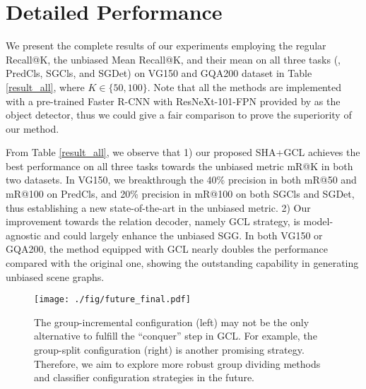 \documentclass[10pt,twocolumn,letterpaper]{article}
\begin{document}
\section{Detailed Performance}
We present the complete results of our experiments employing the regular Recall@K\cite{lu2016visual}, the unbiased Mean Recall@K\cite{tang2019learning,chen2019knowledge}, and their mean\cite{lin2020gps} on all three tasks (\ie, PredCls, SGCls, and SGDet) on VG150\cite{krishna2016visual} and GQA200\cite{hudson2019gqa} dataset in Table \ref{result_all}, where $K \in \{50,100\}$. Note that all the methods are implemented with a pre-trained Faster R-CNN\cite{Ren2017Faster} with ResNeXt-101-FPN\cite{xie2017aggregated} provided by \cite{tang2020unbiased} as the object detector, thus we could give a fair comparison to prove the superiority of our method.

From Table \ref{result_all}, we observe that 1) our proposed SHA+GCL achieves the best performance on all three tasks towards the unbiased metric mR@K in both two datasets. In VG150, we breakthrough the 40\% precision in both mR@50 and mR@100 on PredCls, and 20\% precision in mR@100 on both SGCls and SGDet, thus establishing a new state-of-the-art in the unbiased metric. 2) Our improvement towards the relation decoder, namely GCL strategy, is model-agnostic and could largely enhance the unbiased SGG. In both VG150 or GQA200, the method equipped with GCL nearly doubles the performance compared with the original one, showing the outstanding capability in generating unbiased scene graphs.

\begin{figure}[t]
	\centering
	\texttt{[image: ./fig/future\_final.pdf]}
	\vspace{-0.4cm}
	\caption{The group-incremental configuration (left) may not be the only alternative to fulfill the ``conquer'' step in GCL. For example, the group-split configuration (right) is another promising strategy. Therefore, we aim to explore more robust group dividing methods and classifier configuration strategies in the future.}
	\vspace{-0.4cm}
	\label{future_work}
\end{figure}
\end{document}
